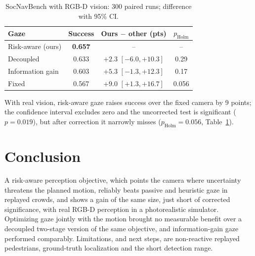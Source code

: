 \documentclass[conference]{IEEEtran}
\begin{document}
\begin{table}[t]
\centering
\caption{SocNavBench with RGB-D vision: 300 paired runs; difference with 95\% CI.}
\label{tab:socnav}
\footnotesize
\begin{tabular}{lccc}
\toprule
Gaze & Success & Ours $-$ other (pts) & $p_\text{Holm}$ \\
\midrule
Risk-aware (ours) & \textbf{0.657} & -- & -- \\
Decoupled         & 0.633 & $+2.3$ $[-6.0, +10.3]$ & 0.29 \\
Information gain  & 0.603 & $+5.3$ $[-1.3, +12.3]$ & 0.17 \\
Fixed             & 0.567 & $+9.0$ $[+1.3, +16.7]$ & 0.056 \\
\bottomrule
\end{tabular}
\vspace{-3mm}
\end{table}

With real vision, risk-aware gaze raises success over the fixed camera by 9 points; the confidence interval excludes zero and the uncorrected test is significant ($p{=}0.019$), but after correction it narrowly misses ($p_\text{Holm}{=}0.056$, Table~\ref{tab:socnav}).

\section{Conclusion}
A risk-aware perception objective, which points the camera where uncertainty threatens the planned motion, reliably beats passive and heuristic gaze in replayed crowds, and shows a gain of the same size, just short of corrected significance, with real RGB-D perception in a photorealistic simulator. Optimizing gaze jointly with the motion brought no measurable benefit over a decoupled two-stage version of the same objective, and information-gain gaze performed comparably. Limitations, and next steps, are non-reactive replayed pedestrians, ground-truth localization and the short detection range.
\end{document}
